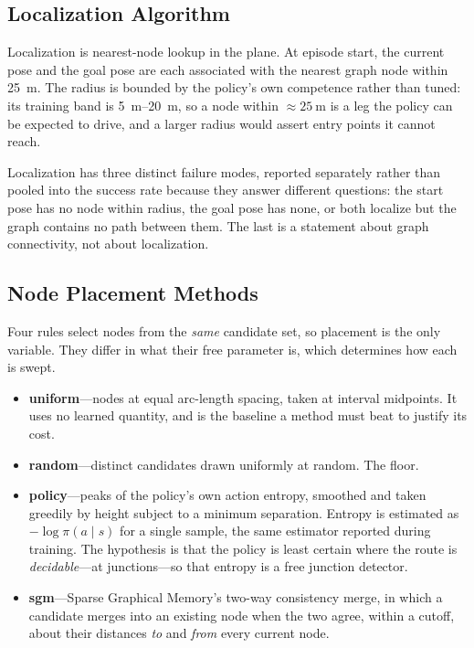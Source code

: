\subsection{Localization Algorithm}
\label{sec:setup:localization}

Localization is nearest-node lookup in the plane. At episode start, the current
pose and the goal pose are each associated with the nearest graph node within
\SI{25}{\meter}. The radius is bounded by the policy's own competence rather
than tuned: its training band is \SI{5}{\meter}--\SI{20}{\meter}, so a node
within $\approx\!\SI{25}{\meter}$ is a leg the policy can be expected to drive,
and a larger radius would assert entry points it cannot reach.

Localization has three distinct failure modes, reported separately rather than
pooled into the success rate because they answer different questions: the start
pose has no node within radius, the goal pose has none, or both localize but the
graph contains no path between them. The last is a statement about graph
connectivity, not about localization.

\subsection{Node Placement Methods}
\label{sec:setup:placement}

Four rules select nodes from the \emph{same} candidate set, so placement is the
only variable. They differ in what their free parameter is, which determines how
each is swept.

\begin{itemize}
  \item \textbf{uniform}---nodes at equal arc-length spacing, taken at interval
        midpoints. It uses no learned quantity, and is the baseline a method
        must beat to justify its cost.
  \item \textbf{random}---distinct candidates drawn uniformly at random. The
        floor.
  \item \textbf{policy}---peaks of the policy's own action entropy, smoothed and
        taken greedily by height subject to a minimum separation. Entropy is
        estimated as $-\log \pi(a\mid s)$ for a single sample, the same
        estimator reported during training. The hypothesis is that the policy is
        least certain where the route is \emph{decidable}---at junctions---so
        that entropy is a free junction detector.
  \item \textbf{sgm}---Sparse Graphical Memory's two-way consistency merge, in
        which a candidate merges into an existing node when the two agree,
        within a cutoff, about their distances \emph{to} and \emph{from} every
        current node.
\end{itemize}

